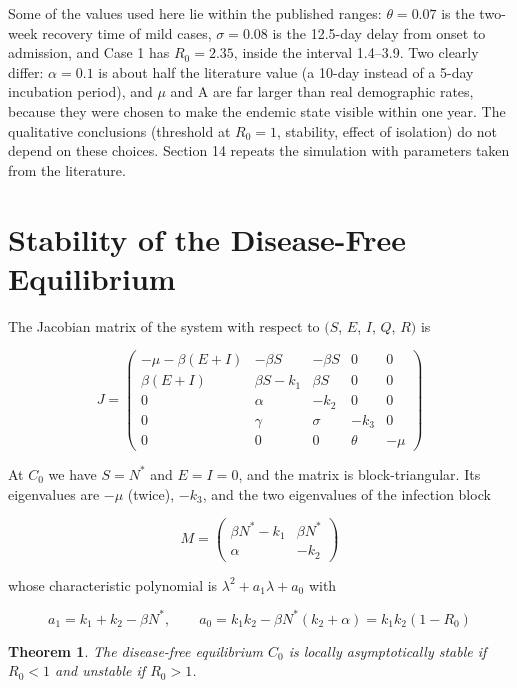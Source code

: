 \documentclass[12pt,a4paper]{article}
\newtheorem{theorem}{Theorem}
\theoremstyle{definition}
\begin{document}
Some of the values used here lie within the published ranges: $\theta = 0.07$ is the two-week recovery time of mild cases, $\sigma = 0.08$ is the 12.5-day delay from onset to admission, and Case 1 has $R_{0} = 2.35$, inside the interval 1.4–3.9. Two clearly differ: $\alpha = 0.1$ is about half the literature value (a 10-day instead of a 5-day incubation period), and $\mu$ and A are far larger than real demographic rates, because they were chosen to make the endemic state visible within one year. The qualitative conclusions (threshold at $R_{0} = 1$, stability, effect of isolation) do not depend on these choices. Section 14 repeats the simulation with parameters taken from the literature.


\section{Stability of the Disease-Free Equilibrium}

The Jacobian matrix of the system with respect to $(S$, $E$, $I$, $Q$, $R)$ is


\[
J = \begin{pmatrix}-\mu-\beta(E+I) & -\beta S & -\beta S & 0 & 0\\ \beta(E+I) & \beta S-k_1 & \beta S & 0 & 0\\ 0 & \alpha & -k_2 & 0 & 0\\ 0 & \gamma & \sigma & -k_3 & 0\\ 0 & 0 & 0 & \theta & -\mu\end{pmatrix}
\]

At $C_{0}$ we have $S = N^*$ and $E = I = 0$, and the matrix is block-triangular. Its eigenvalues are $-\mu$ (twice), $-k_{3}$, and the two eigenvalues of the infection block


\[
M = \begin{pmatrix}\beta N^*-k_1 & \beta N^*\\ \alpha & -k_2\end{pmatrix}
\]

whose characteristic polynomial is $\lambda ^{2} + a_{1}\lambda + a_{0}$ with


\begin{equation}
a_1 = k_1+k_2-\beta N^*,\qquad a_0 = k_1k_2-\beta N^*(k_2+\alpha) = k_1k_2(1-R_0)
\end{equation}

\begin{theorem}
The disease-free equilibrium $C_{0}$ is locally asymptotically stable if $R_{0} < 1$ and unstable if $R_{0} > 1$.
\end{theorem}
\end{document}
